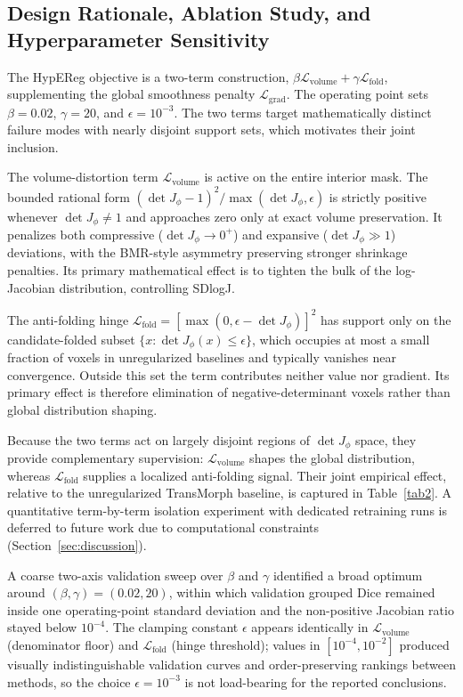 \documentclass[jimaging,article,submit,pdftex,moreauthors]{Definitions/mdpi}
\begin{document}
\subsection{Design Rationale, Ablation Study, and Hyperparameter Sensitivity}\label{sec:hypereg_roles}
The HypEReg objective is a two-term construction, \(\beta\mathcal{L}_{\mathrm{volume}}+\gamma\mathcal{L}_{\mathrm{fold}}\), supplementing the global smoothness penalty \(\mathcal{L}_{\mathrm{grad}}\). The operating point sets \(\beta=0.02\), \(\gamma=20\), and \(\epsilon=10^{-3}\). The two terms target mathematically distinct failure modes with nearly disjoint support sets, which motivates their joint inclusion.

The volume-distortion term \(\mathcal{L}_{\mathrm{volume}}\) is active on the entire interior mask. The bounded rational form \((\det J_\phi-1)^2/\max(\det J_\phi,\epsilon)\) is strictly positive whenever \(\det J_\phi \neq 1\) and approaches zero only at exact volume preservation. It penalizes both compressive (\(\det J_\phi\to 0^+\)) and expansive (\(\det J_\phi\gg 1\)) deviations, with the BMR-style asymmetry preserving stronger shrinkage penalties. Its primary mathematical effect is to tighten the bulk of the log-Jacobian distribution, controlling SDlogJ.

The anti-folding hinge \(\mathcal{L}_{\mathrm{fold}}=[\max(0,\epsilon-\det J_\phi)]^2\) has support only on the candidate-folded subset \(\{x:\det J_\phi(x)\le\epsilon\}\), which occupies at most a small fraction of voxels in unregularized baselines and typically vanishes near convergence. Outside this set the term contributes neither value nor gradient. Its primary effect is therefore elimination of negative-determinant voxels rather than global distribution shaping.

Because the two terms act on largely disjoint regions of \(\det J_\phi\) space, they provide complementary supervision: \(\mathcal{L}_{\mathrm{volume}}\) shapes the global distribution, whereas \(\mathcal{L}_{\mathrm{fold}}\) supplies a localized anti-folding signal. Their joint empirical effect, relative to the unregularized TransMorph baseline, is captured in Table~\ref{tab2}. A quantitative term-by-term isolation experiment with dedicated retraining runs is deferred to future work due to computational constraints (Section~\ref{sec:discussion}).

A coarse two-axis validation sweep over \(\beta\) and \(\gamma\) identified a broad optimum around \((\beta,\gamma)=(0.02,20)\), within which validation grouped Dice remained inside one operating-point standard deviation and the non-positive Jacobian ratio stayed below \(10^{-4}\). The clamping constant \(\epsilon\) appears identically in \(\mathcal{L}_{\mathrm{volume}}\) (denominator floor) and \(\mathcal{L}_{\mathrm{fold}}\) (hinge threshold); values in \([10^{-4},10^{-2}]\) produced visually indistinguishable validation curves and order-preserving rankings between methods, so the choice \(\epsilon=10^{-3}\) is not load-bearing for the reported conclusions.
\end{document}
